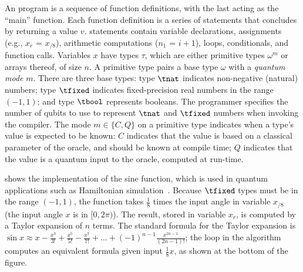 
An \vqimp program is a sequence of function definitions, with the last
acting as the ``main'' function. Each function definition is a series
of statements that concludes by returning a value $v$.  \vqimp statements contain
variable declarations, assignments (e.g., $x_r\texttt{ = }x_{/8}$),
arithmetic computations ($n_1\texttt{ = }i+1$), loops, conditionals,
and function calls.
Variables $x$ have types $\tau$, which are either primitive types
$\omega^m$ or arrays thereof, of size $n$. A primitive type pairs a
base type $\omega$ with a \emph{quantum mode} $m$. There are three base
types: type $\tnat$ indicates non-negative (natural) numbers; type
$\tfixed$ indicates fixed-precision real numbers in the range $(-1,1)$;
and type $\tbool$ represents booleans. The programmer specifies the
number of qubits to use to represent $\tnat$ and $\tfixed$ numbers
when invoking the \vqimp compiler.  
%
The mode $m \in\{C, Q\}$ on a primitive type indicates when a
type's value is expected to be known: $C$ indicates that the value is based
on a classical parameter of the oracle, and should be known at compile
time; $Q$ indicates that the value is a quantum input to the oracle, 
computed at run-time. 

 shows the \vqimp implementation of the sine function,
which is used in quantum applications such as Hamiltonian
simulation~\cite{feynman1982simulating,Childs_2009}. 
Because $\tfixed$ types must be in the range $(-1,1)$, the function
takes $\frac{1}{8}$ times the input angle in variable $x_{/8}$ (the input 
angle $x$ is in $[0,2\pi)$). The result, stored in variable $x_r$, 
is computed by a Taylor expansion of $n$ terms.
The standard formula for the Taylor expansion is
$\sin{x}\approx
x-\frac{x^3}{3!}+\frac{x^5}{5!}-\frac{x^7}{7!}+...+(-1)^{n-1}\frac{x^{2n-1}}{(2n-1)!}$;
the loop in the algorithm computes an equivalent formula given input
$\frac{1}{8}x$, as shown at the bottom of the figure. 


